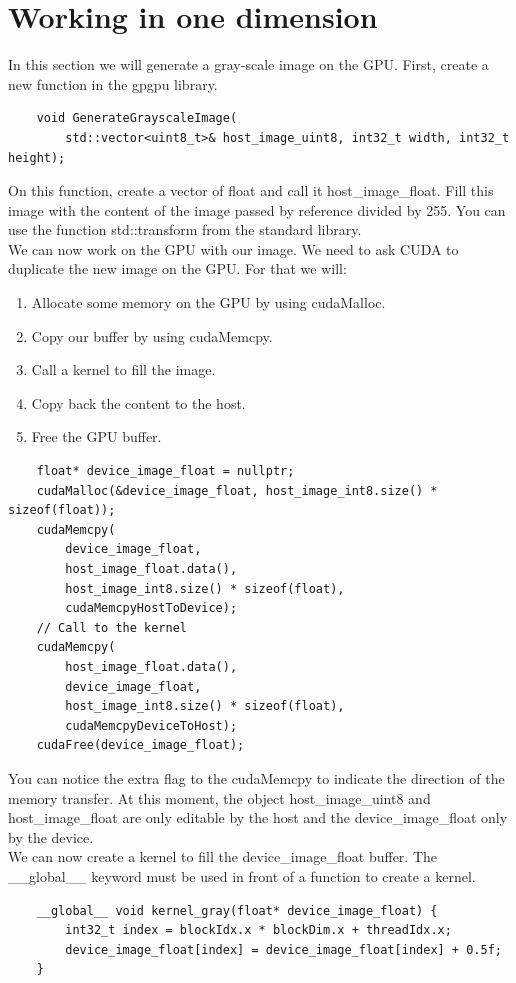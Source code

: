 \documentclass{article}
\begin{document}
\section{Working in one dimension}
In this section we will generate a gray-scale image on the GPU. First, create a new function in the gpgpu library.
\begin{lstlisting}
	void GenerateGrayscaleImage(
		std::vector<uint8_t>& host_image_uint8, int32_t width, int32_t height);
\end{lstlisting}
On this function, create a vector of float and call it host\_image\_float. Fill this image with the content of the image passed by reference divided by 255. You can use the function std::transform from the standard library.\\
We can now work on the GPU with our image. We need to ask CUDA to duplicate the new image on the GPU. For that we will:
\begin{enumerate}
	\item Allocate some memory on the GPU by using cudaMalloc.
	\item Copy our buffer by using cudaMemcpy.
	\item Call a kernel to fill the image.
	\item Copy back the content to the host.
	\item Free the GPU buffer.
\end{enumerate}
\begin{lstlisting}
	float* device_image_float = nullptr;
	cudaMalloc(&device_image_float, host_image_int8.size() * sizeof(float));
	cudaMemcpy(
		device_image_float,
		host_image_float.data(),
		host_image_int8.size() * sizeof(float),
		cudaMemcpyHostToDevice);
	// Call to the kernel
	cudaMemcpy(
		host_image_float.data(),
		device_image_float,
		host_image_int8.size() * sizeof(float),
		cudaMemcpyDeviceToHost);
	cudaFree(device_image_float);
\end{lstlisting}
You can notice the extra flag to the cudaMemcpy to indicate the direction of the memory transfer. At this moment, the object host\_image\_uint8 and host\_image\_float are only editable by the host and the device\_image\_float only by the device.\\
We can now create a kernel to fill the device\_image\_float buffer. The \_\_global\_\_ keyword must be used in front of a function to create a kernel.
\begin{lstlisting}
	__global__ void kernel_gray(float* device_image_float) {
		int32_t index = blockIdx.x * blockDim.x + threadIdx.x;
		device_image_float[index] = device_image_float[index] + 0.5f;
	}
\end{lstlisting}
\end{document}
